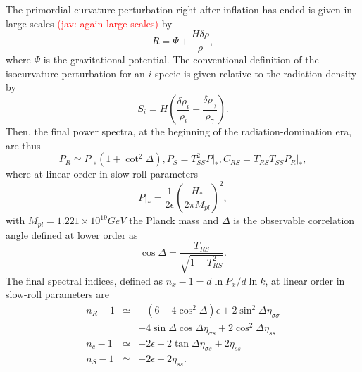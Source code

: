 \documentclass[amssymb,twocolumn,prd,nofootinbib,showpacs]{revtex4-1}
\newcommand{\jav}[1]{\textcolor{red}{(jav: #1)}}
\begin{document}
The primordial curvature perturbation right after inflation has ended is given in large scales \jav{again large scales} by
%
\begin{equation}
R=\Psi+\frac{H\delta\rho}{\rho},
\end{equation}
%
where $\Psi$ is the gravitational potential. The conventional definition of the isocurvature perturbation for an $i$ specie is 
given relative to the radiation density by
%
\begin{equation}
S_i=H\left(\frac{\delta\rho_{i}}{\rho_{i}}-\frac{\delta\rho_\gamma}{\rho_\gamma}\right).
\end{equation}
%
Then, the final power spectra, at the beginning of the radiation-domination era, are thus
%
\begin{subequations}\label{spectrums}
\begin{equation}\label{PRf}
P_R\simeq P|_*(1+\cot^2\Delta),
\end{equation}
\begin{equation}\label{isosecond}
P_S=T^2_{SS}P|_*,
\end{equation}
\begin{equation}
C_{RS}=T_{RS}T_{SS}P_R|_*,
\end{equation}
\end{subequations}
%
where at linear order in slow-roll parameters
%
\begin{equation}
P|_*=\frac{1}{2\epsilon}\left(\frac{H_*}{2\pi M_{pl}}\right)^2,
\end{equation}
%
with $M_{pl}=1.221\times 10^{19}GeV$ the Planck mass and $\Delta$ is the observable correlation angle 
defined at lower order as
%
\begin{equation}
\cos\Delta =\frac{T_{RS}}{\sqrt{1+T_{RS}^2}}.
\end{equation}
%
The final spectral indices, defined as $n_x-1=d\ln P_x/d\ln k$, at linear order in slow-roll parameters are
%
\begin{subequations}\label{tilts}
\begin{eqnarray}
n_R-1&\simeq & -(6-4\cos^2\Delta)\epsilon+2\sin^2\Delta\eta_{\sigma\sigma}\nonumber \\ &&+4\sin\Delta\cos\Delta\eta_{\sigma s}+2\cos^2\Delta\eta_{ss}\\
n_c-1&\simeq &-2\epsilon+2\tan\Delta\eta_{\sigma s}+2\eta_{ss}\\
n_S-1&\simeq & -2\epsilon+2\eta_{ss}.
\end{eqnarray}
\end{subequations}
\end{document}
